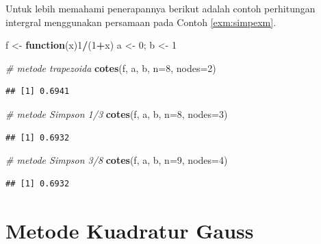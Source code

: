 \documentclass[
]{book}
\newenvironment{Shaded}{\begin{snugshade}}{\end{snugshade}}
\newcommand{\AttributeTok}[1]{\textcolor[rgb]{0.13,0.29,0.53}{#1}}
\newcommand{\CommentTok}[1]{\textcolor[rgb]{0.56,0.35,0.01}{\textit{#1}}}
\newcommand{\ControlFlowTok}[1]{\textcolor[rgb]{0.13,0.29,0.53}{\textbf{#1}}}
\newcommand{\DecValTok}[1]{\textcolor[rgb]{0.00,0.00,0.81}{#1}}
\newcommand{\FunctionTok}[1]{\textcolor[rgb]{0.13,0.29,0.53}{\textbf{#1}}}
\newcommand{\NormalTok}[1]{#1}
\newcommand{\OtherTok}[1]{\textcolor[rgb]{0.56,0.35,0.01}{#1}}
\newcommand{\SpecialCharTok}[1]{\textcolor[rgb]{0.81,0.36,0.00}{\textbf{#1}}}
\theoremstyle{definition}
\theoremstyle{definition}
\theoremstyle{definition}
\theoremstyle{definition}
\theoremstyle{remark}
\begin{document}
Untuk lebih memahami penerapannya berikut adalah contoh perhitungan intergral menggunakan persamaan pada Contoh \ref{exm:simpexm}.

\begin{Shaded}
\begin{Highlighting}[]
\NormalTok{f }\OtherTok{\textless{}{-}} \ControlFlowTok{function}\NormalTok{(x)}\DecValTok{1}\SpecialCharTok{/}\NormalTok{(}\DecValTok{1}\SpecialCharTok{+}\NormalTok{x)}
\NormalTok{a }\OtherTok{\textless{}{-}} \DecValTok{0}\NormalTok{; b }\OtherTok{\textless{}{-}} \DecValTok{1}

\CommentTok{\# metode trapezoida}
\FunctionTok{cotes}\NormalTok{(f, a, b, }\AttributeTok{n=}\DecValTok{8}\NormalTok{, }\AttributeTok{nodes=}\DecValTok{2}\NormalTok{)}
\end{Highlighting}
\end{Shaded}

\begin{verbatim}
## [1] 0.6941
\end{verbatim}

\begin{Shaded}
\begin{Highlighting}[]
\CommentTok{\# metode Simpson 1/3}
\FunctionTok{cotes}\NormalTok{(f, a, b, }\AttributeTok{n=}\DecValTok{8}\NormalTok{, }\AttributeTok{nodes=}\DecValTok{3}\NormalTok{)}
\end{Highlighting}
\end{Shaded}

\begin{verbatim}
## [1] 0.6932
\end{verbatim}

\begin{Shaded}
\begin{Highlighting}[]
\CommentTok{\# metode Simpson 3/8}
\FunctionTok{cotes}\NormalTok{(f, a, b, }\AttributeTok{n=}\DecValTok{9}\NormalTok{, }\AttributeTok{nodes=}\DecValTok{4}\NormalTok{)}
\end{Highlighting}
\end{Shaded}

\begin{verbatim}
## [1] 0.6932
\end{verbatim}

\hypertarget{kuadgauss}{%
\section{Metode Kuadratur Gauss}\label{kuadgauss}}
\end{document}
